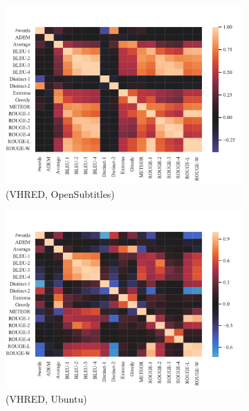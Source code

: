 \begin{figure}[htbp]
\begin{subfigure}{0.40\linewidth}
        \includegraphics[width=\linewidth]{figure/plot/heatmap/v2/pearson/vhred/opensub/plot.pdf}
        \caption{(VHRED, OpenSubtitles)}
    \end{subfigure}%
    \begin{subfigure}{0.40\linewidth}
        \centering
        \includegraphics[width=\linewidth]{figure/plot/heatmap/v2/pearson/vhred/ubuntu/plot.pdf}
        \caption{(VHRED, Ubuntu)}
    \end{subfigure}
    \begin{subfigure}{0.40\linewidth}
        \centering

\end{subfigure}
\end{figure}
